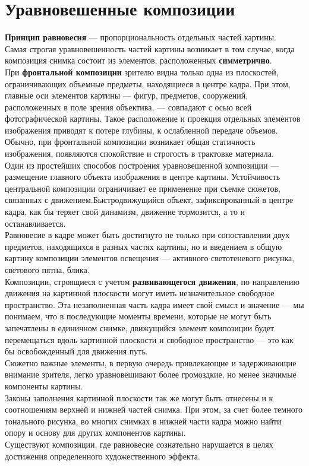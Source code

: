 \documentclass{article}
\begin{document}
\section{Уравновешенные композиции}
\textbf{Принцип равновесия} --- пропорциональность отдельных частей картины.
\\
Самая строгая уравновешенность частей картины возникает в том случае, когда композиция снимка состоит из элементов, расположенных \textbf{симметрично}. 
\\
При \textbf{фронтальной композиции} зрителю видна только одна из плоскостей, ограничивающих объемные предметы, находящиеся в центре кадра. При этом, главные оси элементов картины --- фигур, предметов, сооружений, расположенных в поле зрения объектива, --- совпадают с осью всей фотографической картины. Такое расположение и проекция отдельных элементов изображения приводят к потере глубины, к ослабленной передаче объемов. Обычно, при фронтальной композиции возникает общая статичность изображения, появляются спокойствие и строгость в трактовке материала.
\\
Один из простейших способов построения уравновешенной композиции --- размещение главного объекта изображения в центре картины. Устойчивость центральной композиции ограничивает ее применение при съемке сюжетов, связанных с движением.Быстродвижущийся объект, зафиксированный в центре кадра, как бы теряет свой динамизм, движение тормозится, а то и останавливается.
\\
Равновесие в кадре может быть достигнуто не только при сопоставлении двух предметов, находящихся в разных частях картины, но и введением в общую картину композиции элементов освещения --- активного светотеневого рисунка, светового пятна, блика.
\\
Композиции, строящиеся с учетом \textbf{развивающегося движения}, по направлению движения на картинной плоскости могут иметь незначительное свободное пространство. Эта незаполненная часть кадра имеет свой смысл и значение --- мы понимаем, что в последующие моменты времени, которые не могут быть запечатлены в единичном снимке, движущийся элемент композиции будет перемещаться вдоль картинной плоскости и свободное пространство --- это как бы освобожденный для движения путь.
\\ 
Сюжетно важные элементы, в первую очередь привлекающие и задерживающие внимание зрителя, легко уравновешивают более громоздкие, но менее значимые компоненты картины.
\\
Законы заполнения картинной плоскости так же могут быть отнесены и к соотношениям верхней и нижней частей снимка. При этом, за счет более темного тонального рисунка, во многих снимках в нижней части кадра можно найти опору и основу для других компонентов картины. 
\\
Существуют композиции, где равновесие сознательно нарушается в целях достижения определенного художественного эффекта.
\end{document}
